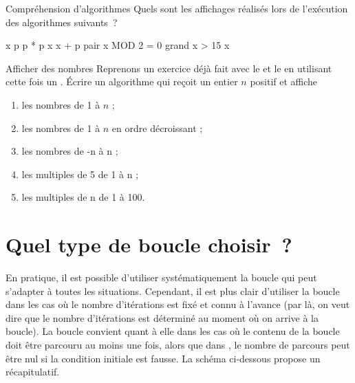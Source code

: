 		\begin{Exercice}{Compréhension d’algorithmes}
			Quels sont les affichages réalisés lors de l’exécution
			des algorithmes suivants~?

			\begin{LDA}
					\Let x 
					\Let p 
					\Repeat
						\Let p  * p
						\Let x \Gets x + p
						\Let pair \Gets x MOD 2 = 0
						\Let grand \Gets x > 15
					\Write x
				\EndAlgo
			\end{LDA}		
		
		\end{Exercice}

		\begin{Exercice}{Afficher des nombres}
			Reprenons un exercice déjà fait avec le \lda{\algorithmicwhile}
			et le \lda{\algorithmicfor}
			en utilisant cette fois un \lda{\algorithmicrepeat} \lda{\algorithmicwhile}.
			Écrire un algorithme qui reçoit un entier $n$ positif et affiche
			\begin{enumerate}[label=\alph*)]
			\item les nombres de 1 à $n$ ;
			\item les nombres de 1 à $n$ en ordre décroissant ;
			\item les nombres de -n à n ;
			\item les multiples de 5 de 1 à n ;
			\item les multiples de n de 1 à 100.
			\end{enumerate}
		\end{Exercice}

\section{Quel type de boucle choisir~?}

	En pratique, il est possible d’utiliser systématiquement la boucle 
	 qui peut s’adapter à toutes les situations. 
	Cependant, il est plus clair d’utiliser la boucle  
	dans les cas où le nombre d’itérations est fixé et connu à l’avance 
	(par là, on veut dire que le nombre d’itérations est déterminé au moment 
	où on arrive à la boucle). 
	La boucle  convient quant à elle
	dans les cas où le contenu de la boucle doit être parcouru au moins une
	fois, alors que dans , 
	le nombre de parcours peut être nul si la condition initiale est fausse. 
	La schéma ci-dessous propose un récapitulatif.

